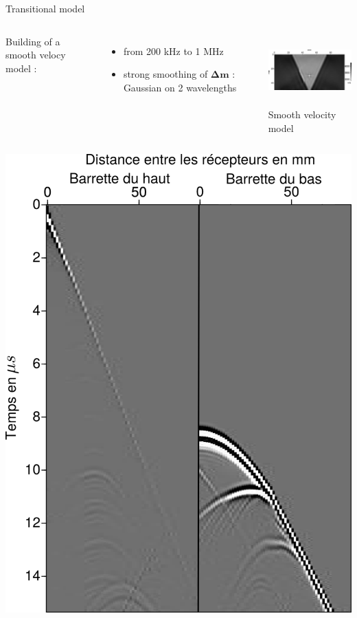 \documentclass[10pt,xcolor=x11names,compress, notes=show]{beamer}%
\begin{document}
\begin{frame}{Transitional model}
	\begin{columns}
	Building of a smooth velocy model : 
	\begin{itemize}
		\item from 200 kHz to 1 MHz
		\item strong smoothing of $\bm{\Delta m}$ :  Gaussian on 2 wavelengths
	\end{itemize}
		\centering
		\vspace{-1cm}
		\includegraphics[height=2.7cm]{img/vp_mono_smooth/vp_smooth.png}\\
		\small{Smooth velocity model}
	\end{columns}
	\vspace{0.3cm}
	\begin{columns}
		\column{0.3\textwidth}
		\centering
		\includegraphics[width=\textwidth]{img/rho_mono/data_rho_uni.png}\\

\end{columns}
\end{frame}
\end{document}
